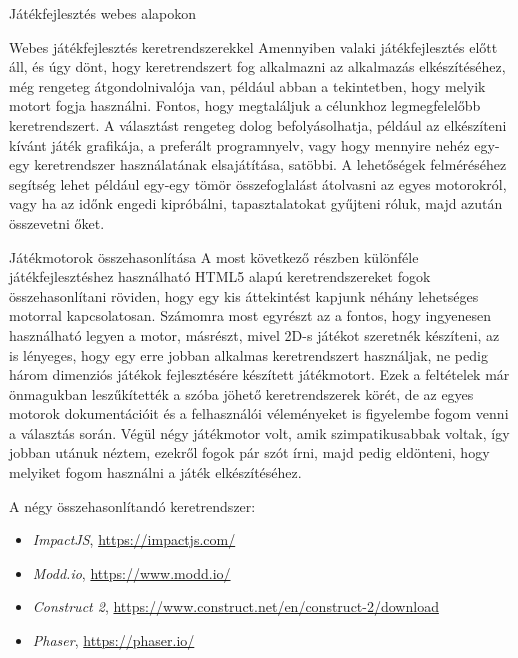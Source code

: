 \begin{MyChapter}{Játékfejlesztés webes alapokon}
\begin{MySection}{Webes játékfejlesztés keretrendszerekkel}
		Amennyiben valaki játékfejlesztés előtt áll, és úgy dönt, hogy keretrendszert fog alkalmazni az alkalmazás elkészítéséhez, még rengeteg átgondolnivalója van, például abban a tekintetben, hogy melyik motort fogja használni. Fontos, hogy megtaláljuk a célunkhoz legmegfelelőbb keretrendszert. A választást rengeteg dolog befolyásolhatja, például az elkészíteni kívánt játék grafikája, a preferált programnyelv, vagy hogy mennyire nehéz egy-egy keretrendszer használatának elsajátítása, satöbbi. A lehetőségek felméréséhez segítség lehet például egy-egy tömör összefoglalást átolvasni az egyes motorokról, vagy ha az időnk engedi kipróbálni, tapasztalatokat gyűjteni róluk, majd azután összevetni őket.
		
		\begin{MySubSection}{Játékmotorok összehasonlítása}
			A most következő részben különféle játékfejlesztéshez használható HTML5 alapú keretrendszereket fogok összehasonlítani röviden, hogy egy kis áttekintést kapjunk néhány lehetséges motorral kapcsolatosan. Számomra most egyrészt az a fontos, hogy ingyenesen használható legyen a motor, másrészt, mivel 2D-s játékot szeretnék készíteni, az is lényeges, hogy egy erre jobban alkalmas keretrendszert használjak, ne pedig három dimenziós játékok fejlesztésére készített játékmotort. 
			Ezek a feltételek már önmagukban leszűkítették a szóba jöhető keretrendszerek körét, de az egyes motorok dokumentációit és a felhasználói véleményeket is figyelembe fogom venni a választás során. Végül négy játékmotor volt, amik szimpatikusabbak voltak, így jobban utánuk néztem, ezekről fogok pár szót írni, majd pedig eldönteni, hogy melyiket fogom használni a játék elkészítéséhez.
			
			A négy összehasonlítandó keretrendszer:
			
			\begin{itemize}
				\item \textit{ImpactJS}, \url{https://impactjs.com/}
				\item \textit{Modd.io}, \url{https://www.modd.io/}
				\item \textit{Construct 2}, \url{https://www.construct.net/en/construct-2/download}
				\item \textit{Phaser}, \url{https://phaser.io/}
			\end{itemize}
		\end{MySubSection}
	

\end{MySection}
\end{MyChapter}
